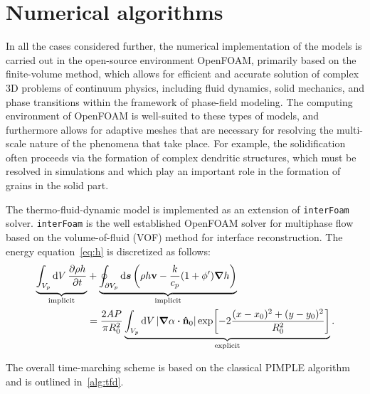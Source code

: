 \documentclass{article}
\newcommand{\OpenFOAM}{OpenFOAM\textregistered\xspace}
\newcommand{\bv}{\vb{v}}
\newcommand{\bn}{\vu{n}}
\newcommand{\intCell}{\int_{V_p} \dd{V}}
\newcommand{\intFaces}{\oint_{\partial V_p} \dd{\vb*{s}}}
\begin{document}
\section{Numerical algorithms}

In all the cases considered further, the numerical implementation of the models is carried out
in the open-source environment \OpenFOAM, primarily based on the finite-volume method,
which allows for efficient and accurate solution of complex 3D problems of continuum physics,
including fluid dynamics, solid mechanics, and phase transitions within the framework of phase-field modeling.
The computing environment of \OpenFOAM is well-suited to these types of models,
and furthermore allows for adaptive meshes that are necessary
for resolving the multi-scale nature of the phenomena that take place.
For example, the solidification often proceeds via the formation of complex dendritic structures,
which must be resolved in simulations and which play an important role in the formation of grains in the solid part.

The thermo-fluid-dynamic model is implemented as an extension of \verb+interFoam+ solver.
\verb+interFoam+ is the well established \OpenFOAM solver for multiphase flow
based on the volume-of-fluid (VOF) method for interface reconstruction.
The energy equation~\eqref{eq:h} is discretized as follows:
\begin{equation}\label{eq:h_scheme}
    \begin{aligned}
    \underbrace{
        \intCell \pdv{\rho h}{t}
    }_\text{implicit} &+ \underbrace{
        \intFaces \qty(\rho h\bv - \frac{k}{c_p}(1+\phi')\grad{h})
    }_\text{implicit} \\ &= \frac{2AP}{\pi R_0^2}\underbrace{
        \intCell |\grad\alpha\vdot\bn_0|\exp[-2\frac{(x-x_0)^2 + (y-y_0)^2}{R_0^2}]
    }_\text{explicit}.
    \end{aligned}
\end{equation}

The overall time-marching scheme is based on the classical PIMPLE algorithm
and is outlined in~\ref{alg:tfd}.
\end{document}
